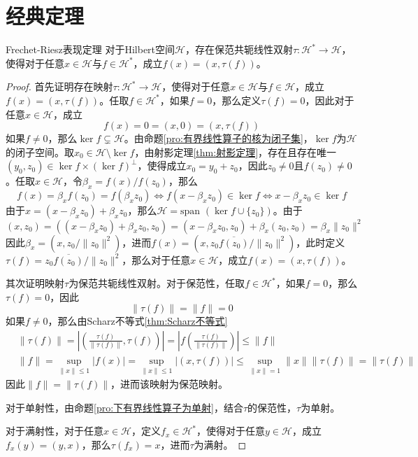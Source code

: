 \documentclass[lang = cn, scheme = chinese, thmcnt = section]{elegantbook}
\begin{document}
\chapter{经典定理}

\begin{theorem}{Frechet-Riesz表现定理}
	对于Hilbert空间$\mathcal{H}$，存在保范共轭线性双射$\tau:\mathcal{H}^*\to \mathcal{H}$，使得对于任意$x\in \mathcal{H}$与$f\in \mathcal{H}^*$，成立$f(x)=(x,\tau(f))$。
\end{theorem}

\begin{proof}
	首先证明存在映射$\tau:\mathcal{H}^*\to \mathcal{H}$，使得对于任意$x\in \mathcal{H}$与$f\in \mathcal{H}$，成立$f(x)=(x,\tau(f))$。任取$f\in \mathcal{H}^*$，如果$f=0$，那么定义$\tau(f)=0$，因此对于任意$x\in \mathcal{H}$，成立
	$$
	f(x)=0=(x,0)=(x,\tau(f))
	$$
	如果$f\ne 0$，那么$\ker f\subsetneq \mathcal{H}$。由命题\ref{pro:有界线性算子的核为闭子集}，$\ker f$为$\mathcal{H}$的闭子空间。取$x_0\in \mathcal{H}\setminus\ker f$，由射影定理\ref{thm:射影定理}，存在且存在唯一$(y_0,z_0)\in\ker f\times(\ker f)^\perp$，使得成立$x_0=y_0+z_0$，因此$z_0\ne0$且$f(z_0)\ne0$。任取$x\in\mathcal{H}$，令$\beta_x=f(x)/f(z_0)$，那么
	$$
	f(x)=\beta_xf(z_0)=f(\beta_x z_0)\iff f(x-\beta_xz_0)\in\ker f\iff x-\beta_xz_0\in\ker f
	$$
	由于$x=(x-\beta_xz_0)+\beta_xz_0$，那么$\mathcal{H}=\text{span }(\ker f\cup\{z_0\})$。由于
	$$
	(x,z_0)=((x-\beta_xz_0)+\beta_xz_0,z_0)=(x-\beta_xz_0,z_0)+\beta_x(z_0,z_0)
	=\beta_x\|z_0\|^2
	$$
	因此$\beta_x=(x,z_0/\|z_0\|^2)$，进而$f(x)=(x,z_0\overline{f(z_0)}/\|z_0\|^2)$，此时定义$\tau(f)=z_0\overline{f(z_0)}/\|z_0\|^2$，那么对于任意$x\in \mathcal{H}$，成立$f(x)=(x,\tau(f))$。
	
	其次证明映射$\tau$为保范共轭线性双射。对于保范性，任取$f\in\mathcal{H}^*$，如果$f=0$，那么$\tau(f)=0$，因此
	$$
	\|\tau(f)\|=\|f\|=0
	$$
	如果$f\ne 0$，那么由Scharz不等式\ref{thm:Scharz不等式}
	$$
	\begin{align*}
		&\| \tau(f)\|
		=\left|\left(\frac{\tau(f)}{\|\tau(f)\|},\tau(f)\right)\right|
		=\left|f\left(\frac{\tau(f)}{\|\tau(f)\|}\right)\right|
		\le \|f\|\\
		&\|f\|
		=\sup_{\|x\|\le 1}|f(x)|
		=\sup_{\|x\|\le 1}|(x,\tau(f))|
		\le\sup_{\|x\|=1}\|x\|\|\tau(f)\|=\|\tau(f)\|
	\end{align*}
	$$
	因此$\|f\|=\|\tau(f)\|$，进而该映射为保范映射。
	
	对于单射性，由命题\ref{pro:下有界线性算子为单射}，结合$\tau$的保范性，$\tau$为单射。
	
	对于满射性，对于任意$x\in\mathcal{H}$，定义$f_x\in\mathcal{H}^*$，使得对于任意$y\in\mathcal{H}$，成立$f_x(y)=(y,x)$，那么$\tau(f_x)=x$，进而$\tau$为满射。
	

\end{proof}
\end{document}

